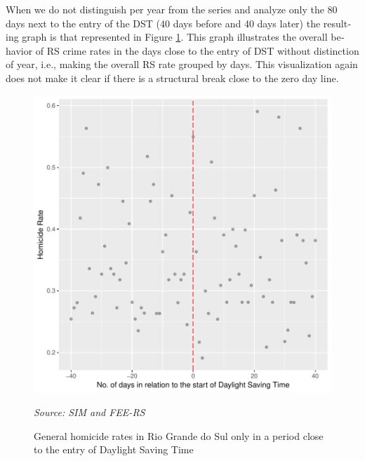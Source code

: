 \documentclass[12pt,openright,oneside,a4paper,english,french,spanish]{abntex2}
\numberwithin{table}{section} %
\numberwithin{figure}{section} %
\newcommand{\source}[1]{\textit{#1}}
\begin{document}
\begin{otherlanguage}{english}
When we do not distinguish per year from the series and analyze only the 80 days next to the entry of the DST (40 days before and 40 days later) the resulting graph is that represented in Figure \ref{fig:taxas_homicidios_por_ano_RS_empilhado_agrupando_Diff}. This graph illustrates the overall behavior of RS crime rates in the days close to the entry of DST without distinction of year, i.e., making the overall RS rate grouped by days. This visualization again does not make it clear if there is a structural break close to the zero day line.

\begin{figure}[H]
\begin{center}
\includegraphics{TESE_DE_DOUTORADO_RENAN_FINAL-plot2_HV}
\end{center}
\caption{General homicide rates in Rio Grande do Sul only in a period close to the entry of Daylight Saving Time}
\source{Source: SIM and FEE-RS}
\label{fig:taxas_homicidios_por_ano_RS_empilhado_agrupando_Diff}
\end{figure}




\end{otherlanguage}
\end{document}
